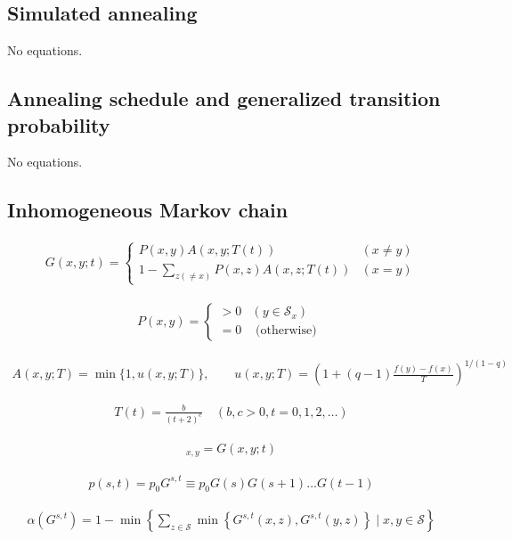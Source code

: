 \documentclass{article}
\begin{document}
\subsection{Simulated annealing}

No equations.

\subsection{Annealing schedule and generalized transition probability}

No equations.

\subsection{Inhomogeneous Markov chain}

\begin{align*}
G(x, y ; t)= \begin{cases}P(x, y) A(x, y ; T(t)) & (x \neq y) \\ 1-\sum_{z(\neq x)} P(x, z) A(x, z ; T(t)) & (x=y)\end{cases}
\tag{9.62}
\end{align*}

\begin{align*}
P(x, y) = \begin{cases}>0 & \left(y \in \mathcal{S}_{x}\right) \\ =0 & \text { (otherwise) }\end{cases}
\tag{9.63}
\end{align*}

\begin{align*}
A(x, y ; T)=\min \{1, u(x, y ; T)\}, \qquad u(x, y ; T)=\left(1+(q-1) \frac{f(y)-f(x)}{T}\right)^{1 /(1-q)}
\tag{9.64}
\end{align*}

\begin{align*}
T(t)=\frac{b}{(t+2)^{c}} \quad(b, c>0, t=0,1,2, \ldots)
\tag{9.65}
\end{align*}

\begin{align*}
[G(t)]_{x, y}=G(x, y ; t)
\tag{9.66}
\end{align*}

\begin{align*}
p(s, t)=p_{0} G^{s, t} \equiv p_{0} G(s) G(s+1) \ldots G(t-1)
\tag{9.67}
\end{align*}

\begin{align*}
\alpha\left(G^{s, t}\right)=1-\min \left\{\sum_{z \in \mathcal{S}} \min \left\{G^{s, t}(x, z), G^{s, t}(y, z)\right\} \mid x, y \in \mathcal{S}\right\}
\tag{9.68}
\end{align*}
\end{document}
